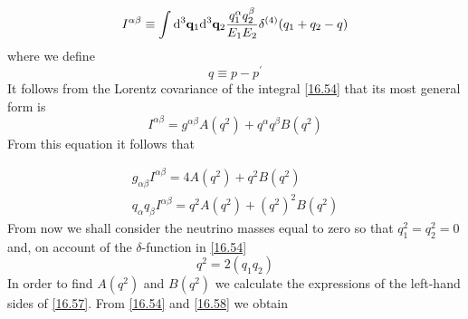 \begin{equation} \label{16.54}
I^{\alpha \beta} \equiv \int \dd^3 \vb{q}_{1} \dd^3 \vb{q}_{2} \frac{q_{1}^{\alpha} q_{2}^{\beta} }{E_1 E_2} \delta^{(4)} ( q_1 + q_2 - q )
\end{equation}
where we define
\begin{equation} \label{16.55}
q \equiv p - p^'
\end{equation}
It follows from the Lorentz covariance of the integral \eqref{16.54} that its most general form is
\begin{equation} \label{16.56}
I^{\alpha \beta} = g^{\alpha \beta} A (q^2) + q^{\alpha} q^{\beta} B(q^2)
\end{equation}
From this equation it follows that 

\begin{eqnarray} \label{16.57}
g_{\alpha \beta} I^{\alpha \beta} = 4 A (q^2) + q^2 B(q^2) \\
q_{\alpha} q_{ \beta} I^{\alpha \beta} = q^2 A (q^2) + (q^2)^2 B(q^2)
\end{eqnarray}
From now we shall consider the neutrino masses equal to zero so that  $q_1^2 = q_2^2 = 0 $ and, on account of the $\delta$-function in \eqref{16.54}
\begin{equation} \label{16.58}
q^2 = 2 (q_1 q_2)
\end{equation}
In order to find $A(q^2)$ and $B(q^2)$ we calculate the expressions of the left-hand sides of \eqref{16.57}. From \eqref{16.54} and \eqref{16.58} we obtain

